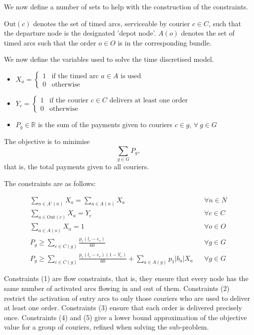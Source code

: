 \documentclass{article}
\begin{document}
We now define a number of sets to help with the construction of the constraints.

$\text{Out}(c)$ denotes the set of timed arcs, serviceable by courier $c\in C$, such that the departure node is the designated 'depot node'. $A(o)$ denotes the set of timed arcs such that the order $o\in O$ is in the corresponding bundle.

We now define the variables used to solve the time discretised model.

\begin{itemize}
\item $X_a=\begin{cases}1&\text{if the timed arc }a\in A\text{ is used}\\0&\text{otherwise}\end{cases}$
\item $Y_c=\begin{cases}1&\text{if the courier }c\in C\text{ delivers at least one order}\\0&\text{otherwise}\end{cases}$
\item $P_g\in\mathbb R$ is the sum of the payments given to couriers $c\in g$, $\forall~g\in G$
\end{itemize}

The objective is to minimise $$\sum_{g\in G}P_g,$$ that is, the total payments given to all couriers.

The constraints are as follows:

\begin{align}
\sum_{a\in A'(n)}X_a=\sum_{a\in A(n)}X_a&&\forall n\in N\\
\sum_{a\in\text{Out}(c)}X_a=Y_c&&\forall c\in C\\
\sum_{a\in A(o)}X_a=1&&\forall o\in O\\
P_g\geq\sum_{c\in C(g)}\frac{p_c(l_c-e_c)}{60}&&\forall g\in G\\
P_g\geq\sum_{c\in C(g)}\frac{p_c(l_c-e_c)(1-Y_c)}{60} + \sum_{a\in A(g)}p_1|b_a|X_a&&\forall g\in G
\end{align}

Constraints (1) are flow constraints, that is, they ensure that every node has the same number of activated arcs flowing in and out of them.  Constraints (2) restrict the activation of entry arcs to only those couriers who are used to deliver at least one order. Constraints (3) ensure that each order is delivered precisely once. Constraints (4) and (5) give a lower bound approximation of the objective value for a group of couriers, refined when solving the sub-problem.
\end{document}
